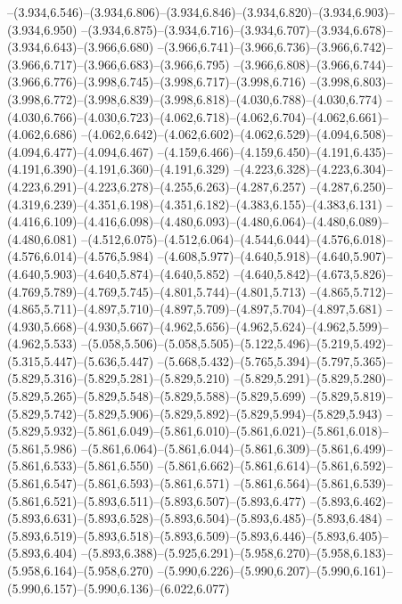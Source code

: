   --(3.934,6.546)--(3.934,6.806)--(3.934,6.846)--(3.934,6.820)--(3.934,6.903)--(3.934,6.950)%
  --(3.934,6.875)--(3.934,6.716)--(3.934,6.707)--(3.934,6.678)--(3.934,6.643)--(3.966,6.680)%
  --(3.966,6.741)--(3.966,6.736)--(3.966,6.742)--(3.966,6.717)--(3.966,6.683)--(3.966,6.795)%
  --(3.966,6.808)--(3.966,6.744)--(3.966,6.776)--(3.998,6.745)--(3.998,6.717)--(3.998,6.716)%
  --(3.998,6.803)--(3.998,6.772)--(3.998,6.839)--(3.998,6.818)--(4.030,6.788)--(4.030,6.774)%
  --(4.030,6.766)--(4.030,6.723)--(4.062,6.718)--(4.062,6.704)--(4.062,6.661)--(4.062,6.686)%
  --(4.062,6.642)--(4.062,6.602)--(4.062,6.529)--(4.094,6.508)--(4.094,6.477)--(4.094,6.467)%
  --(4.159,6.466)--(4.159,6.450)--(4.191,6.435)--(4.191,6.390)--(4.191,6.360)--(4.191,6.329)%
  --(4.223,6.328)--(4.223,6.304)--(4.223,6.291)--(4.223,6.278)--(4.255,6.263)--(4.287,6.257)%
  --(4.287,6.250)--(4.319,6.239)--(4.351,6.198)--(4.351,6.182)--(4.383,6.155)--(4.383,6.131)%
  --(4.416,6.109)--(4.416,6.098)--(4.480,6.093)--(4.480,6.064)--(4.480,6.089)--(4.480,6.081)%
  --(4.512,6.075)--(4.512,6.064)--(4.544,6.044)--(4.576,6.018)--(4.576,6.014)--(4.576,5.984)%
  --(4.608,5.977)--(4.640,5.918)--(4.640,5.907)--(4.640,5.903)--(4.640,5.874)--(4.640,5.852)%
  --(4.640,5.842)--(4.673,5.826)--(4.769,5.789)--(4.769,5.745)--(4.801,5.744)--(4.801,5.713)%
  --(4.865,5.712)--(4.865,5.711)--(4.897,5.710)--(4.897,5.709)--(4.897,5.704)--(4.897,5.681)%
  --(4.930,5.668)--(4.930,5.667)--(4.962,5.656)--(4.962,5.624)--(4.962,5.599)--(4.962,5.533)%
  --(5.058,5.506)--(5.058,5.505)--(5.122,5.496)--(5.219,5.492)--(5.315,5.447)--(5.636,5.447)%
  --(5.668,5.432)--(5.765,5.394)--(5.797,5.365)--(5.829,5.316)--(5.829,5.281)--(5.829,5.210)%
  --(5.829,5.291)--(5.829,5.280)--(5.829,5.265)--(5.829,5.548)--(5.829,5.588)--(5.829,5.699)%
  --(5.829,5.819)--(5.829,5.742)--(5.829,5.906)--(5.829,5.892)--(5.829,5.994)--(5.829,5.943)%
  --(5.829,5.932)--(5.861,6.049)--(5.861,6.010)--(5.861,6.021)--(5.861,6.018)--(5.861,5.986)%
  --(5.861,6.064)--(5.861,6.044)--(5.861,6.309)--(5.861,6.499)--(5.861,6.533)--(5.861,6.550)%
  --(5.861,6.662)--(5.861,6.614)--(5.861,6.592)--(5.861,6.547)--(5.861,6.593)--(5.861,6.571)%
  --(5.861,6.564)--(5.861,6.539)--(5.861,6.521)--(5.893,6.511)--(5.893,6.507)--(5.893,6.477)%
  --(5.893,6.462)--(5.893,6.631)--(5.893,6.528)--(5.893,6.504)--(5.893,6.485)--(5.893,6.484)%
  --(5.893,6.519)--(5.893,6.518)--(5.893,6.509)--(5.893,6.446)--(5.893,6.405)--(5.893,6.404)%
  --(5.893,6.388)--(5.925,6.291)--(5.958,6.270)--(5.958,6.183)--(5.958,6.164)--(5.958,6.270)%
  --(5.990,6.226)--(5.990,6.207)--(5.990,6.161)--(5.990,6.157)--(5.990,6.136)--(6.022,6.077)%
